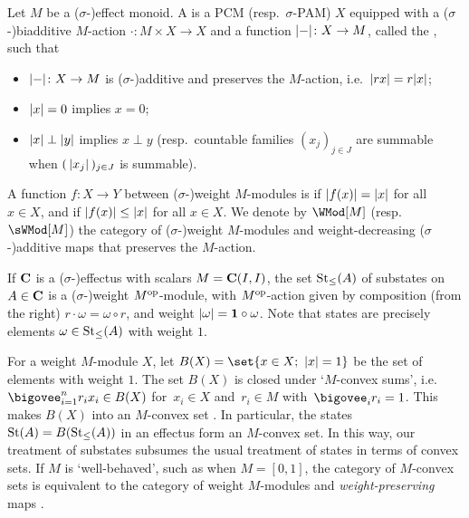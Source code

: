 \documentclass[%
	submission,
copyright,creativecommons,UKenglish]{eptcs}
\begin{document}
\begin{definition}
\label{def:wpmod}
Let $M$ be a ($\sigma$-)effect monoid. %
A 
is a PCM (resp.\ $\sigma$-PAM) $X$ equipped with
a ($\sigma$-)biadditive %
$M$-action $\cdot\colon M\times X\to X$
and a function $\lvert-\rvert\colon X\to M$,
called the , such that
\begin{itemize}
\item $\lvert-\rvert\colon X\to M$ is ($\sigma$-)additive 
and preserves the $M$-action,
i.e.\ $\lvert rx\rvert=r\lvert x\rvert$;
\item $\lvert x\rvert = 0$ implies $x=0$;
\item $\lvert x\rvert \perp \lvert y\rvert$ implies $x \perp y$
(resp.\ countable families $(x_j)_{j\in J}$ are summable
when $(\,\lvert x_j\rvert\,)_{j\in J}$ is summable).
\end{itemize}
A function $f\colon X\to Y$
between ($\sigma$-)weight $M$-modules
is 
if $\lvert f(x)\rvert=\lvert x\rvert$
for all $x\in X$,
and
if
$\lvert f(x)\rvert\le\lvert x\rvert$
for all $x\in X$.
We denote by
$\WMod[M]$
(resp.\ $\sWMod[M]$)
the category of
($\sigma$-)weight $M$-modules
and weight-decreasing ($\sigma$-)additive
maps that preserves the $M$-action.
\end{definition}

\begin{example}
  If $\mathbf{C}$ is a ($\sigma$-)effectus
  with scalars $M=\mathbf{C}(I,I)$,
  the set $\mathrm{St}_{\le}(A)$ of substates
  on $A\in\mathbf{C}$ is a ($\sigma$-)weight $M^{\mathrm{op}}$-module,
  with $M^{\mathrm{op}}$-action given by composition
  (from the right) $r\cdot \omega=\omega\circ r$,
  and weight $\lvert\omega\rvert=\mathbf{1}\circ \omega$.
  Note that states are precisely
  elements $\omega\in\mathrm{St}_{\le}(A)$ with weight $1$.
\end{example}

For a weight $M$-module $X$,
let $B(X)=\set{x\in X;\ \weight{x}=1 }$
be the set of elements with weight $1$.
The set $B(X)$ is closed under `$M$-convex sums',
i.e.\ $\bigovee^n_{i=1} r_i x_i \in B(X)$
    for~$x_i \in X$ and~$r_i \in M$ with~$\bigovee_i r_i = 1$.
This makes $B(X)$ into an $M$-convex set
\cite[\S\,3.6]{Cho2019PhD}.
In particular, the
states $\mathrm{St}(A)=B(\mathrm{St}_{\le}(A))$ in an effectus
form an $M$-convex set.
In this way, our treatment of
substates subsumes the usual treatment of states
in terms of convex sets.
If $M$ is `well-behaved',
such as when $M=[0,1]$,
the category of $M$-convex sets
is equivalent to
the category of weight $M$-modules
and \emph{weight-preserving} maps
\cite[Proposition 4.4.10]{Cho2019PhD}.
\end{document}
